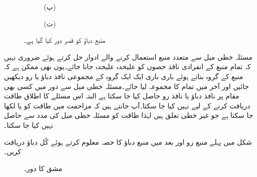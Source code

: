 \begin{figure}
\begin{subfigure}{0.5\textwidth}
\caption*{(پ)}
\end{subfigure}%
\begin{subfigure}{0.5\textwidth}
\centering
{}
\caption*{(ت)}
\end{subfigure}%
\caption{منبع دباؤ کو قصر دور کیا گیا ہے۔}
\label{شکل_مسئلہ_منبع_دباو_قصر_دور_کیا_گیا_ہے}
\end{figure}

مسئلہ خطی میل سے متعدد منبع استعمال کرنے والے ادوار حل کرتے ہوئے ضروری نہیں کہ تمام منبع کے انفرادی نافذ حصوں کو علیحدہ علیحدہ جانا جائے۔یوں بھی ممکن ہے کہ منبع کے گروہ بناتے ہوئے باری باری ایک ایک گروہ کے مجموعی نافذ دباؤ یا رو دیکھیں جائیں اور آخر میں تمام کا مجموعہ لیا جائے۔مسئلہ خطی میل سے دور میں کسی بھی مقام پر نافذ  دباؤ یا نافذ رو حاصل کیا جا سکتا ہے البتہ اس مسئلے کا اطلاق طاقت دریافت کرنے کے لیے نہیں کیا جا سکتا۔آپ جانتے ہیں کہ مزاحمت میں طاقت کو  یا  لکھا جا سکتا ہے جو غیر خطی تعلق ہیں لہٰذا طاقت کو مسئلہ خطی میل کی مدد سے حاصل نہیں کیا جا سکتا۔

شکل  میں پہلے منبع رو اور بعد میں منبع دباؤ کا حصہ معلوم کرتے ہوئے کُل دباؤ  دریافت کریں۔

\begin{figure}
\centering
{}
\caption{مشق  کا دور۔}
\label{شکل_مسئلہ_باری_باری_الف}
\end{figure}

